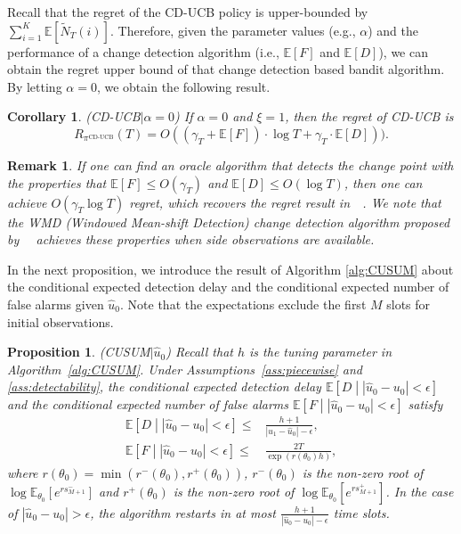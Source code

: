 \documentclass[letterpaper]{article}
\newtheorem{corollary}{Corollary}
\newtheorem{remark}{Remark}
\newtheorem{proposition}{Proposition}
\newcommand{\blue}{}
\begin{document}
Recall that the regret of the CD-UCB policy is upper-bounded by
$\sum_{i=1}^K\mathbb{E}[\tilde{N}_T(i)]$.
{\blue Therefore, given the parameter values (e.g., $\alpha$) and
 the performance of a change detection algorithm (i.e.,
 $\mathbb{E}[F]$ and $\mathbb{E}[D]$),
we can obtain the regret upper bound of that change detection based
bandit algorithm.}
{\blue By letting $\alpha=0$, we obtain the following result.}

\begin{corollary}\label{thm:0CD-UCB}
\emph{(CD-UCB$|\alpha=0$)} If $\alpha=0$ and $\xi=1$, then the regret of CD-UCB is
\begin{equation}
R_{\pi^{\text{CD-UCB}}}(T)=O((\gamma_T+\mathbb{E}[F])\cdot\log T+\gamma_T\cdot\mathbb{E}[D])).
\end{equation}
\end{corollary}
\begin{remark}
If one can find an oracle algorithm that detects the change point with
the properties that $\mathbb{E}[F]\leq O(\gamma_T)$ and
$\mathbb{E}[D]\leq O(\log T)$, then one can achieve $O(\gamma_T \log
T)$ regret, which recovers the regret result
in~\citeauthor{yu2009piecewise}~. We note that the WMD (Windowed Mean-shift Detection) change detection algorithm proposed by~\citeauthor{yu2009piecewise}~ achieves these properties when side observations are available.
\end{remark}
In the next proposition, we introduce the result of Algorithm
\ref{alg:CUSUM} about the conditional expected detection delay and the
conditional expected number of false alarms given $\hat{u}_0$. Note
that the expectations exclude the first $M$ slots for initial observations.
\begin{proposition}\label{prop:CUSUM}
\emph{(CUSUM$|\hat{u}_0$)}
Recall that $h$ is the tuning parameter in Algorithm~\ref{alg:CUSUM}.
Under Assumptions~\ref{ass:piecewise} and \ref{ass:detectability},
the conditional expected detection delay $\mathbb{E}\left[D\middle||\hat{u}_0-u_0|<\epsilon\right]$ and the conditional expected number of false alarms $\mathbb{E}\left[F\middle||\hat{u}_0-u_0|<\epsilon\right]$ satisfy
\begin{align}
\mathbb{E}\left[D\middle||\hat{u}_0-u_0|<\epsilon\right]\leq&\frac{h+1}{|u_1-\hat{u}_0|-\epsilon},\\
\mathbb{E}\left[F\middle||\hat{u}_0-u_0|<\epsilon\right]\leq&\frac{2T}{\exp(r(\theta_0)h)},
\end{align}
where $r(\theta_0)=\min(r^-(\theta_0),r^+(\theta_0))$, $r^-(\theta_0)$ is the non-zero root of $\log\mathbb{E}_{\theta_0}[e^{rs^-_{M+1}}]$ and $r^+(\theta_0)$ is the non-zero root of $\log\mathbb{E}_{\theta_0}[e^{rs^+_{M+1}}]$.
In the case of $|\hat{u}_0-u_0|>\epsilon$, the algorithm restarts in at most $\frac{h+1}{|\hat{u}_0-u_0|-\epsilon}$ time slots.
\end{proposition}
\end{document}
